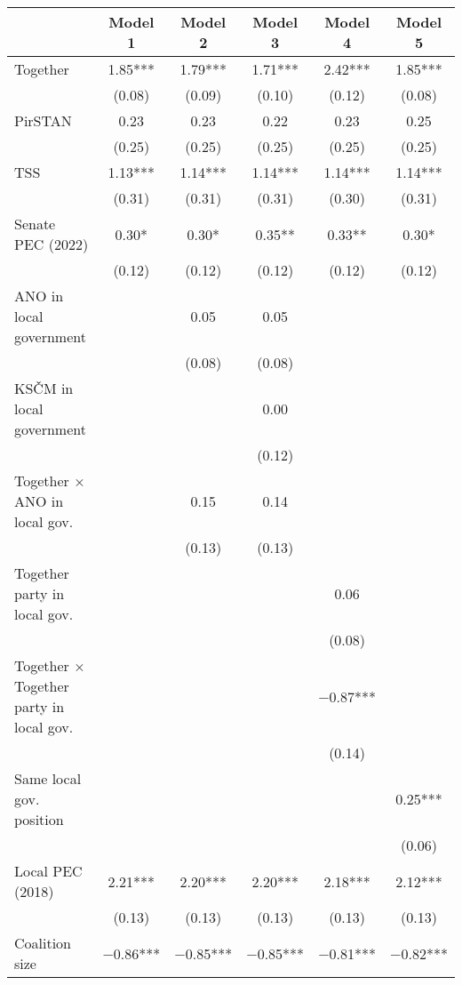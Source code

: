 \begin{table}
\centering
\begin{tabular}[t]{lccccc}
\toprule
  & Model 1 & Model 2 & Model 3 & Model 4 & Model 5\\
\midrule
Together & \num{1.85}*** & \num{1.79}*** & \num{1.71}*** & \num{2.42}*** & \num{1.85}***\\
 & (\num{0.08}) & (\num{0.09}) & (\num{0.10}) & (\num{0.12}) & (\num{0.08})\\
PirSTAN & \num{0.23} & \num{0.23} & \num{0.22} & \num{0.23} & \num{0.25}\\
 & (\num{0.25}) & (\num{0.25}) & (\num{0.25}) & (\num{0.25}) & (\num{0.25})\\
TSS & \num{1.13}*** & \num{1.14}*** & \num{1.14}*** & \num{1.14}*** & \num{1.14}***\\
 & (\num{0.31}) & (\num{0.31}) & (\num{0.31}) & (\num{0.30}) & (\num{0.31})\\
Senate PEC (2022) & \num{0.30}* & \num{0.30}* & \num{0.35}** & \num{0.33}** & \num{0.30}*\\
 & (\num{0.12}) & (\num{0.12}) & (\num{0.12}) & (\num{0.12}) & (\num{0.12})\\
ANO in local government &  & \num{0.05} & \num{0.05} &  & \\
 &  & (\num{0.08}) & (\num{0.08}) &  & \\
KSČM in local government &  &  & \num{0.00} &  & \\
 &  &  & (\num{0.12}) &  & \\
Together × ANO in local gov. &  & \num{0.15} & \num{0.14} &  & \\
 &  & (\num{0.13}) & (\num{0.13}) &  & \\
Together party in local gov. &  &  &  & \num{0.06} & \\
 &  &  &  & (\num{0.08}) & \\
Together × Together party in local gov. &  &  &  & \num{-0.87}*** & \\
 &  &  &  & (\num{0.14}) & \\
Same local gov. position &  &  &  &  & \num{0.25}***\\
 &  &  &  &  & (\num{0.06})\\
Local PEC (2018) & \num{2.21}*** & \num{2.20}*** & \num{2.20}*** & \num{2.18}*** & \num{2.12}***\\
 & (\num{0.13}) & (\num{0.13}) & (\num{0.13}) & (\num{0.13}) & (\num{0.13})\\
Coalition size & \num{-0.86}*** & \num{-0.85}*** & \num{-0.85}*** & \num{-0.81}*** & \num{-0.82}***\\

\end{tabular}
\end{table}
